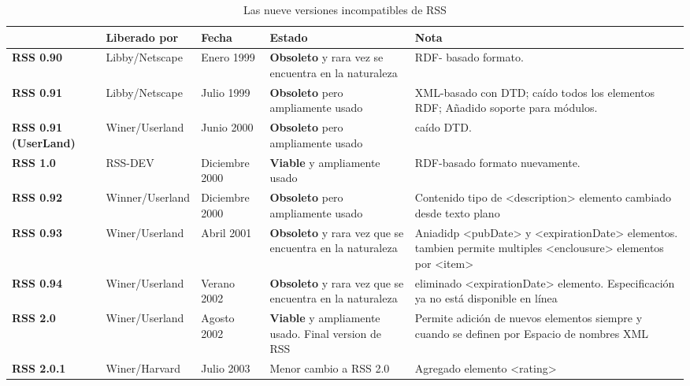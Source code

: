 \begin{table}[h]

\begin{center}

\begin{tabular}{>{\centering\arraybackslash}m{.1\linewidth} |>{\centering\arraybackslash}m{.2\linewidth}|>{\centering\arraybackslash}m{.1\linewidth}|>{\centering\arraybackslash}m{.2\linewidth}|>{\centering\arraybackslash}m{.4\linewidth}}
 & \textbf{Liberado por} & \textbf{Fecha} & \textbf{Estado} & \textbf{Nota} \\
\hline

\textbf{RSS 0.90} & Libby/Netscape & Enero 1999 & \textbf{Obsoleto} y rara vez se encuentra en la naturaleza & RDF- basado formato. \\
\hline

\textbf{RSS 0.91 } & Libby/Netscape & Julio 1999 & \textbf{Obsoleto} pero ampliamente usado & XML-basado con DTD; caído todos los elementos RDF; Añadido soporte para módulos. \\
\hline 

\textbf{RSS 0.91 (UserLand) } & Winer/Userland & Junio 2000 & \textbf{Obsoleto} pero ampliamente usado & caído DTD. \\
\hline 

\textbf{RSS 1.0} & RSS-DEV & Diciembre 2000 & \textbf{Viable} y ampliamente usado & RDF-basado formato nuevamente.\\
\hline

\textbf{RSS 0.92} & Winner/Userland & Diciembre 2000 & \textbf{Obsoleto} pero ampliamente usado & Contenido tipo de <description> elemento cambiado desde texto plano\\
\hline

\textbf{RSS 0.93} & Winer/Userland & Abril 2001 & \textbf{Obsoleto} y rara vez que se encuentra en la naturaleza & Aniadidp <pubDate> y <expirationDate> elementos. tambien permite multiples <enclousure> elementos por <item> \\
\hline

\textbf{RSS 0.94} & Winer/Userland & Verano 2002 & \textbf{Obsoleto} y rara vez que se encuentra en la naturaleza & eliminado <expirationDate> elemento. Especificación ya no está disponible en línea\\
\hline

\textbf{RSS 2.0} & Winer/Userland & Agosto 2002 & \textbf{Viable} y ampliamente usado. Final version de RSS & Permite adición de nuevos elementos siempre y cuando se definen por Espacio de nombres XML\\
\hline 

\textbf{RSS 2.0.1} & Winer/Harvard & Julio 2003 & Menor cambio a RSS 2.0 & Agregado elemento <rating>\\
\hline 

\end{tabular}

\caption{Las nueve versiones incompatibles de RSS}

\end{center}

\end{table}


